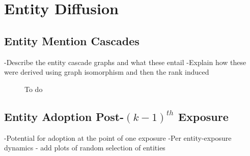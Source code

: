 \documentclass[journal,10pt,draftclsnofoot,onecolumn]{IEEEtran}
\begin{document}
\clearpage
\section{Entity Diffusion}

\subsection{Entity Mention Cascades}
-Describe the entity cascade graphs and what these entail
-Explain how these were derived using graph isomorphism and then the rank induced

\begin{figure}[ht!]
  \begin{center}
  \end{center}    
  \caption{To do}
  \label{fig:entity_cascades}
\end{figure}


\subsection{Entity Adoption Post-$({k-1})^{th}$ Exposure}
-Potential for adoption at the point of one exposure
-Per entity-exposure dynamics - add plots of random selection of entities
\end{document}
